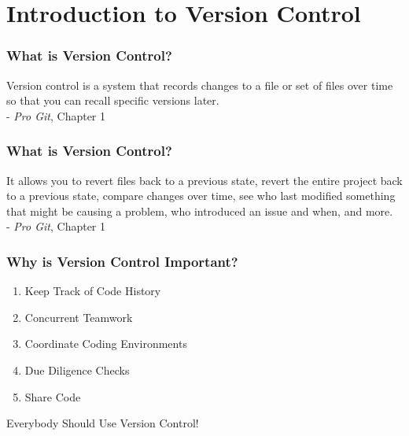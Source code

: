 
\section[Introduction]{Introduction to Version Control}

\begin{frame}
\frametitle{\large{What is Version Control?}}
Version control is a system that records changes to a file or set of files over time so that you can recall specific versions later. \\
\vspace{3mm}
- \emph{Pro Git}, Chapter 1
\end{frame}
\note{}

\begin{frame}
\frametitle{\large{What is Version Control?}}
It allows you to revert files back to a previous state, revert the entire project back to a previous state, compare changes over time, see who last modified something that might be causing a problem, who introduced an issue and when, and more. \\
\vspace{3mm}
- \emph{Pro Git}, Chapter 1
\end{frame}

\begin{frame}
\frametitle{\large{Why is Version Control Important?}}
\begin{enumerate}
\item Keep Track of Code History
\pause
\item Concurrent Teamwork
\pause
\item Coordinate Coding Environments
\pause
\item Due Diligence Checks
\pause
\item Share Code
\end{enumerate}
\pause
\vspace{5mm}
Everybody Should Use Version Control!
\end{frame}
\note{}

